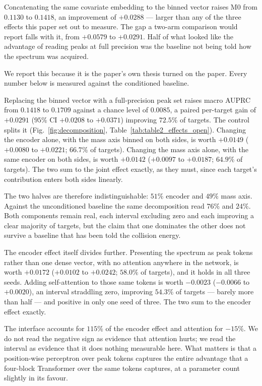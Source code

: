 Concatenating the same covariate embedding to the binned vector raises M0 from
$0.1130$ to $0.1418$, an improvement of $+0.0288$ --- larger than any of the three
effects this paper set out to measure. The gap a two-arm comparison would report
falls with it, from $+0.0579$ to $+0.0291$. Half of what looked like the advantage
of reading peaks at full precision was the baseline not being told how the spectrum
was acquired.

We report this because it is the paper's own thesis turned on the paper. Every
number below is measured against the conditioned baseline.

Replacing the binned vector with a full-precision peak set raises macro AUPRC from
$0.1418$ to $0.1709$ against a chance level of $0.0085$, a paired per-target gain of
$+0.0291$ ($95\%$ CI $+0.0208$ to $+0.0371$) improving $72.5\%$ of targets. The
control splits it (Fig.~\ref{fig:decomposition},
Table~\ref{tab:table2_effects_open}). Changing the encoder alone, with the mass axis
binned on both sides, is worth $+0.0149$ ($+0.0080$ to $+0.0221$; $66.7\%$ of
targets). Changing the mass axis alone, with the same encoder on both sides, is
worth $+0.0142$ ($+0.0097$ to $+0.0187$; $64.9\%$ of targets). The two sum to the
joint effect exactly, as they must, since each target's contribution enters both
sides linearly.

The two halves are therefore indistinguishable: $51\%$ encoder and $49\%$ mass axis.
Against the unconditioned baseline the same decomposition read $76\%$ and $24\%$.
Both components remain real, each interval excluding zero and each improving a clear
majority of targets, but the claim that one dominates the other does not survive a
baseline that has been told the collision energy.

The encoder effect itself divides further. Presenting the spectrum as peak tokens
rather than one dense vector, with no attention anywhere in the network, is worth
$+0.0172$ ($+0.0102$ to $+0.0242$; $58.0\%$ of targets), and it holds in all three
seeds. Adding self-attention to those same tokens is worth $-0.0023$ ($-0.0066$ to
$+0.0020$), an interval straddling zero, improving $54.3\%$ of targets --- barely
more than half --- and positive in only one seed of three. The two sum to the
encoder effect exactly.

The interface accounts for $115\%$ of the encoder effect and attention for $-15\%$.
We do not read the negative sign as evidence that attention hurts; we read the
interval as evidence that it does nothing measurable here. What matters is that a
position-wise perceptron over peak tokens captures the entire advantage that a
four-block Transformer over the same tokens captures, at a parameter count slightly
in its favour.


